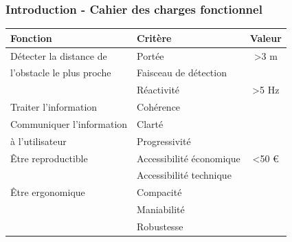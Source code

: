 \documentclass{beamer}
\begin{document}
\begin{frame}
\frametitle{Introduction - Cahier des charges fonctionnel}
\begin{center}
\begin{tabular}{llc}
\hline
{\bf Fonction} & {\bf Critère} & {\bf Valeur} \\
\hline
Détecter la distance de & Portée & \textgreater 3 m \\
l'obstacle le plus proche & Faisceau de détection & \\
 & Réactivité & \textgreater 5 Hz \\
\hline
Traiter l'information & Cohérence & \\
\hline
Communiquer l'information & Clarté & \\
à l'utilisateur & Progressivité & \\
\hline
Être reproductible & Accessibilité économique & \textless 50 € \\
 & Accessibilité technique & \\
\hline
Être ergonomique & Compacité & \\
 & Maniabilité & \\
 & Robustesse & \\
\hline
\end{tabular}
\end{center}
\end{frame}
\end{document}
